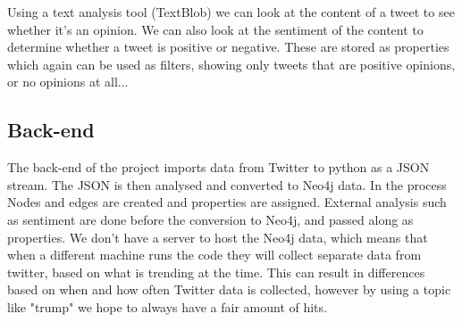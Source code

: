 \documentclass[11pt]{article}
\begin{document}
Using a text analysis tool (TextBlob) we can look at the content of a tweet to see whether it's an opinion. We can also look at the sentiment of the content to determine whether a tweet is positive or negative. These are stored as properties which again can be used as filters, showing only tweets that are positive opinions, or no opinions at all...

\subsection{Back-end}
The back-end of the project imports data from Twitter to python as a JSON stream. The JSON is then analysed and converted to Neo4j data. In the process Nodes and edges are created and properties are assigned. External analysis such as sentiment are done before the conversion to Neo4j, and passed along as properties.
We don't have a server to host the Neo4j data, which means that when a different machine runs the code they will collect separate data from twitter, based on what is trending at the time. This can result in differences based on when and how often Twitter data is collected, however by using a topic like "trump" we hope to always have a fair amount of hits.\newline
\end{document}
